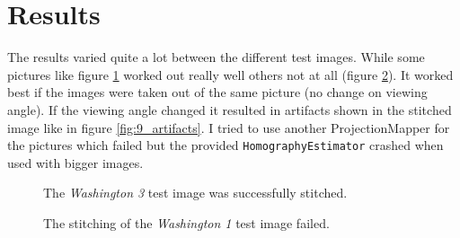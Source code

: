 \section{Results}
The results varied quite a lot between the different test images. While some pictures like figure \ref{fig:9_success} worked out really well others not at all (figure \ref{fig:9_fail}). It worked best if the images were taken out of the same picture (no change on viewing angle). If the viewing angle changed it resulted in artifacts shown in the stitched image like in figure \ref{fig:9_artifacts}. I tried to use another ProjectionMapper for the pictures which failed but the provided \texttt{HomographyEstimator} crashed when used with bigger images.

\begin{figure}
	\centering
	\caption{The \textit{Washington 3} test image was successfully stitched.}
	\label{fig:9_success}
\end{figure}

\begin{figure}
	\centering
	\caption{The stitching of the \textit{Washington 1} test image failed.}
	\label{fig:9_fail}
\end{figure}

